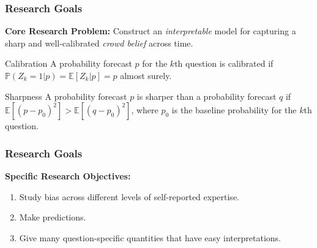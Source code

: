 \documentclass{beamer}
\renewcommand{\P}{\mathbb{P}}
\newcommand{\E}{\mathbb{E}}
\begin{document}
\begin{frame}
\frametitle{Research Goals}
\textbf{Core Research Problem:} Construct an \textit{interpretable} model for capturing a sharp and well-calibrated \textit{crowd belief} across time.
\vspace{1em}

\begin{block}{Calibration}
A probability forecast $p$ for the $k$th question is calibrated if $\P(Z_k = 1 | p) = \E[Z_k | p] = p$ almost surely.
\end{block}
\begin{block}{Sharpness}
A probability forecast $p$ is sharper than a probability forecast $q$ if $\E[(p-p_0)^2] > \E[(q-p_0)^2]$, where $p_0$ is the baseline probability for the $k$th question.
\end{block}

\end{frame}

\begin{frame}
\frametitle{Research Goals}
\textbf{Specific Research Objectives:}
\begin{enumerate}
\item Study bias across different levels of self-reported expertise.
\item Make predictions.
\item Give many question-specific quantities that have easy interpretations. 
\end{enumerate}
\vspace{1em}
\end{frame}
%
\end{document}
